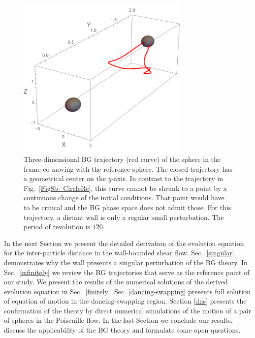 %
\begin{figure}[t]
 \centering
\includegraphics[width=0.75\textwidth]{FigX_BG_closed_trajectory1.pdf}
\caption{Three-dimensional BG trajectory (red curve) of the sphere in the frame co-moving with the reference sphere. The closed trajectory has a geometrical center on the $y$-axis. In contrast to the trajectory in Fig.~\ref{Fig8b_CircleRc}, this curve cannot be shrunk to a point by a continuous change of the initial conditions. That point would have to be critical and the BG phase space does not admit those. For this trajectory, a distant wall is only a regular small perturbation. %
The period of revolution is $120$.}
\label{FigX_BG_closed_trajectory1}
\end{figure}


In the next Section we present the detailed derivation of the evolution equation for the inter-particle distance in the wall-bounded shear flow. Sec.~\ref{singular} demonstrates why the wall presents a singular perturbation of the BG theory. In Sec.~\ref{infinitely} we review the BG trajectories that serve as the reference point of our study. We present the results of the numerical solutions of the derived evolution equation in Sec.~\ref{finitely}. Sec. \ref{dancing-swapping} presents full solution of equation of motion in the dancing-swapping region. Section \ref{dns} presents the confirmation of the theory by direct numerical simulations of the motion of a pair of spheres in the Poiseuille flow. In the last Section we conclude our results, discuss the applicability of the BG theory and formulate some open questions.


